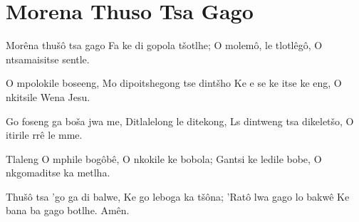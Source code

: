 \starttocol
\chapter{Morena Thuso Tsa Gago}
\nexttocol
\hfill{\it }
\stoptocol
\starttocol
\startlines
{\sc Mor\^ena} thu\v s\^o tsa gago
Fa ke di gopola t\v sotlhe;
O molem\^o, le tlotl\^eg\^o,
O ntsamaisitse sentle.

O mpolokile boseeng,
Mo dipoitshegong tse dint\v sho
Ke e se ke itse ke eng,
O nkitsile Wena Jesu.

Go foseng ga bo\v sa jwa me,
Ditlalelong le ditekong,
Ls dintweng tsa dikelet\v so,
O itirile rr\^e le mme.

Tlaleng O mphile bog\^ob\^e,
O nkokile ke bobola;
Gantsi ke ledile bobe,
O nkgomaditse ka metlha.

Thu\v s\^o tsa 'go ga di balwe,
Ke go leboga ka t\v s\^ona;
'Rat\^o lwa gago lo bakw\^e
Ke bana ba gago botlhe.
          \hfill Am\^en.~~~~~~~~~
\stoplines
\nexttocol

\stoptocol
